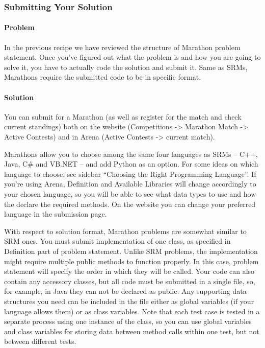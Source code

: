 \documentclass[]{article}
\let\oldparagraph\paragraph
\renewcommand{\paragraph}[1]{\oldparagraph{#1}\mbox{}}
\begin{document}
\hypertarget{submitting-your-solution}{%
\subsubsection{Submitting Your
Solution}\label{submitting-your-solution}}

\hypertarget{problem-2}{%
\paragraph{Problem}\label{problem-2}}

In the previous recipe we have reviewed the structure of Marathon
problem statement. Once you've figured out what the problem is and how
you are going to solve it, you have to actually code the solution and
submit it. Same as SRMs, Marathons require the submitted code to be in
specific format.

\hypertarget{solution-2}{%
\paragraph{Solution}\label{solution-2}}

You can submit for a Marathon (as well as register for the match and
check current standings) both on the website (Competitions
-\textgreater{} Marathon Match -\textgreater{} Active Contests) and in
Arena (Active Contests -\textgreater{} current match).

Marathons allow you to choose among the same four languages as SRMs --
C++, Java, C\# and VB.NET -- and add Python as an option. For some ideas
on which language to choose, see sidebar ``Choosing the Right
Programming Language''. If you're using Arena, Definition and Available
Libraries will change accordingly to your chosen language, so you will
be able to see what data types to use and how the declare the required
methods. On the website you can change your preferred language in the
submission page.

With respect to solution format, Marathon problems are somewhat similar
to SRM ones. You must submit implementation of one class, as specified
in Definition part of problem statement. Unlike SRM problems, the
implementation might require multiple public methods to function
properly. In this case, problem statement will specify the order in
which they will be called. Your code can also contain any accessory
classes, but all code must be submitted in a single file, so, for
example, in Java they can not be declared as public. Any supporting data
structures you need can be included in the file either as global
variables (if your language allows them) or as class variables. Note
that each test case is tested in a separate process using one instance
of the class, so you can use global variables and class variables for
storing data between method calls within one test, but not between
different tests.
\end{document}
